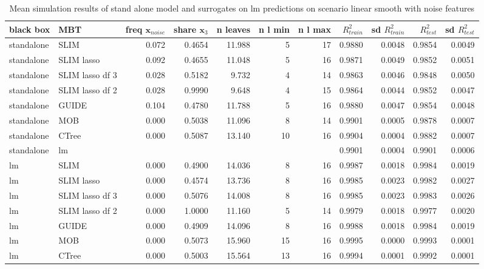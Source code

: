 \begin{table}[!htb]
\centering \tiny
\begin{tabular}[t]{l|l|r|r|r|r|r|r|r|r|r}
\hline
black box & MBT & freq $ \textbf{x}_{noise}$  & share $\textbf{x}_3$ & n leaves & n l min & n l max & $R^2_{train}$  & sd $R^2_{train}$ & $R^2_{test}$ & sd $R^2_{test}$\\
\hline
standalone & SLIM & 0.072 & 0.4654 & 11.988 & 5 & 17 & 0.9880 & 0.0048 & 0.9854 & 0.0049\\
standalone & SLIM lasso & 0.092 & 0.4655 & 11.048 & 5 & 16 & 0.9871 & 0.0049 & 0.9852 & 0.0051\\
standalone & SLIM lasso df 3 & 0.028 & 0.5182 & 9.732 & 4 & 14 & 0.9863 & 0.0046 & 0.9848 & 0.0050\\
standalone & SLIM lasso df 2 & 0.028 & 0.9990 & 9.648 & 4 & 15 & 0.9864 & 0.0044 & 0.9852 & 0.0047\\
standalone & GUIDE & 0.104 & 0.4780 & 11.788 & 5 & 16 & 0.9880 & 0.0047 & 0.9854 & 0.0048\\
standalone & MOB & 0.000 & 0.5038 & 11.096 & 8 & 14 & 0.9901 & 0.0005 & 0.9878 & 0.0007\\
standalone & CTree & 0.000 & 0.5087 & 13.140 & 10 & 16 & 0.9904 & 0.0004 & 0.9882 & 0.0007\\
\hline

standalone & lm & & & & & & 0.9901 & 0.0004 & 0.9901 & 0.0006\\

\hline
lm & SLIM & 0.000 & 0.4900 & 14.036 & 8 & 16 & 0.9987 & 0.0018 & 0.9984 & 0.0019\\
lm & SLIM lasso & 0.000 & 0.4574 & 13.736 & 8 & 16 & 0.9985 & 0.0023 & 0.9982 & 0.0027\\
lm & SLIM lasso df 3 & 0.000 & 0.5076 & 14.008 & 8 & 16 & 0.9985 & 0.0023 & 0.9983 & 0.0026\\
lm & SLIM lasso df 2 & 0.000 & 1.0000 & 11.160 & 5 & 14 & 0.9979 & 0.0018 & 0.9977 & 0.0020\\
lm & GUIDE & 0.000 & 0.4909 & 14.096 & 8 & 16 & 0.9988 & 0.0018 & 0.9984 & 0.0019\\
lm & MOB & 0.000 & 0.5073 & 15.960 & 15 & 16 & 0.9995 & 0.0000 & 0.9993 & 0.0001\\
lm & CTree & 0.000 & 0.5003 & 15.564 & 13 & 16 & 0.9994 & 0.0001 & 0.9992 & 0.0001\\
\hline
\end{tabular}
\caption{Mean simulation results of stand alone model and surrogates on lm predictions on scenario linear smooth with noise features}
\label{tab:linear_smooth_noisy_summary}
\end{table}

